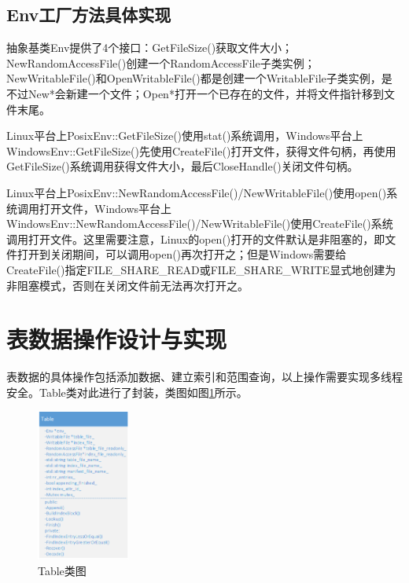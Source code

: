 \documentclass[bachelor]{thesis-uestc}
\begin{document}
\subsection{Env工厂方法具体实现}
抽象基类Env提供了4个接口：GetFileSize()获取文件大小；NewRandomAccessFile()创建一个RandomAccessFile子类实例；NewWritableFile()和OpenWritableFile()都是创建一个WritableFile子类实例，是不过New*会新建一个文件；Open*打开一个已存在的文件，并将文件指针移到文件末尾。\par
Linux平台上PosixEnv::GetFileSize()使用stat()系统调用，Windows平台上WindowsEnv::GetFileSize()先使用CreateFile()打开文件，获得文件句柄，再使用GetFileSize()系统调用获得文件大小，最后CloseHandle()关闭文件句柄。\par
Linux平台上PosixEnv::NewRandomAccessFile()/NewWritableFile()使用open()系统调用打开文件，Windows平台上WindowsEnv::NewRandomAccessFile()/NewWritableFile()使用CreateFile()系统调用打开文件。这里需要注意，Linux的open()打开的文件默认是非阻塞的，即文件打开到关闭期间，可以调用open()再次打开之；但是Windows需要给CreateFile()指定FILE\_SHARE\_READ或FILE\_SHARE\_WRITE显式地创建为非阻塞模式，否则在关闭文件前无法再次打开之。

\section{表数据操作设计与实现}
表数据的具体操作包括添加数据、建立索引和范围查询，以上操作需要实现多线程安全。Table类对此进行了封装，类图如图\ref{fig:table}所示。

\begin{figure}[htbp]
	\centering\includegraphics[height=5cm]{images/table.png}
	\caption{Table类图}
	\label{fig:table}
\end{figure}
\end{document}
